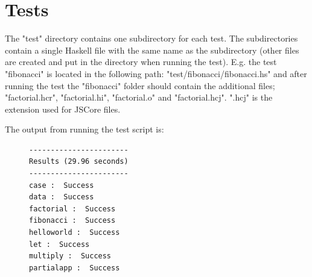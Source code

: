\section{Tests}

The "test" directory contains one subdirectory for each test. The
subdirectories contain a single Haskell file with the same name as the
subdirectory (other files are created and put in the directory when running
the test). E.g. the test "fibonacci" is located in the following path:
"test/fibonacci/fibonacci.hs" and after running the test the "fibonacci"
folder should contain the additional files; "factorial.hcr", "factorial.hi",
"factorial.o" and "factorial.hcj". ".hcj" is the extension used for JSCore
files.

The output from running the test script is:

\begin{figure}[H]
\lstset{ %
language=Python,
caption=Output from running the test script,
label=lst:testoutput
}
\begin{lstlisting}
-----------------------
Results (29.96 seconds)
-----------------------
case :  Success
data :  Success
factorial :  Success
fibonacci :  Success
helloworld :  Success
let :  Success
multiply :  Success
partialapp :  Success
\end{lstlisting}
\end{figure}

